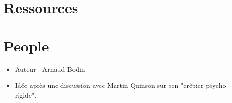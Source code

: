 \documentclass[class=report,crop=false, 12pt]{standalone}
\begin{document}
\section*{Ressources}


\section*{People}

\begin{itemize}
  \item Auteur : Arnaud Bodin
  \item Idée après une discussion avec Martin Quinson sur son "crêpier psycho-rigide".
\end{itemize}
\end{document}
